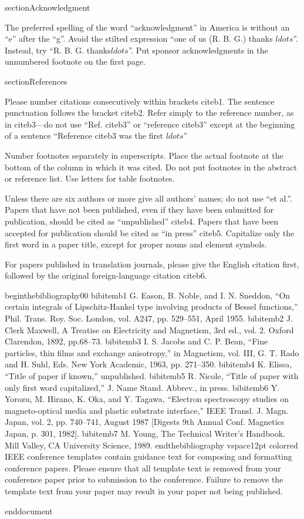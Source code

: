 section{Acknowledgment}

The preferred spelling of the word ``acknowledgment'' in America is without 
an ``e'' after the ``g''. Avoid the stilted expression ``one of us (R. B. 
G.) thanks $ldots$''. Instead, try ``R. B. G. thanks$ldots$''. Put sponsor 
acknowledgments in the unnumbered footnote on the first page.

section{References}

Please number citations consecutively within brackets cite{b1}. The 
sentence punctuation follows the bracket cite{b2}. Refer simply to the reference 
number, as in cite{b3}---do not use ``Ref. cite{b3}'' or ``reference cite{b3}'' except at 
the beginning of a sentence ``Reference cite{b3} was the first $ldots$''

Number footnotes separately in superscripts. Place the actual footnote at 
the bottom of the column in which it was cited. Do not put footnotes in the 
abstract or reference list. Use letters for table footnotes.

Unless there are six authors or more give all authors' names; do not use 
``et al.''. Papers that have not been published, even if they have been 
submitted for publication, should be cited as ``unpublished'' cite{b4}. Papers 
that have been accepted for publication should be cited as ``in press'' cite{b5}. 
Capitalize only the first word in a paper title, except for proper nouns and 
element symbols.

For papers published in translation journals, please give the English 
citation first, followed by the original foreign-language citation cite{b6}.

begin{thebibliography}{00}
bibitem{b1} G. Eason, B. Noble, and I. N. Sneddon, ``On certain integrals of Lipschitz-Hankel type involving products of Bessel functions,'' Phil. Trans. Roy. Soc. London, vol. A247, pp. 529--551, April 1955.
bibitem{b2} J. Clerk Maxwell, A Treatise on Electricity and Magnetism, 3rd ed., vol. 2. Oxford Clarendon, 1892, pp.68--73.
bibitem{b3} I. S. Jacobs and C. P. Bean, ``Fine particles, thin films and exchange anisotropy,'' in Magnetism, vol. III, G. T. Rado and H. Suhl, Eds. New York Academic, 1963, pp. 271--350.
bibitem{b4} K. Elissa, ``Title of paper if known,'' unpublished.
bibitem{b5} R. Nicole, ``Title of paper with only first word capitalized,'' J. Name Stand. Abbrev., in press.
bibitem{b6} Y. Yorozu, M. Hirano, K. Oka, and Y. Tagawa, ``Electron spectroscopy studies on magneto-optical media and plastic substrate interface,'' IEEE Transl. J. Magn. Japan, vol. 2, pp. 740--741, August 1987 [Digests 9th Annual Conf. Magnetics Japan, p. 301, 1982].
bibitem{b7} M. Young, The Technical Writer's Handbook. Mill Valley, CA University Science, 1989.
end{thebibliography}
vspace{12pt}
color{red}
IEEE conference templates contain guidance text for composing and formatting conference papers. Please ensure that all template text is removed from your conference paper prior to submission to the conference. Failure to remove the template text from your paper may result in your paper not being published.

end{document}

